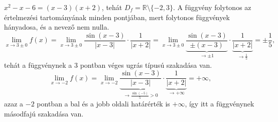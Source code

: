 \documentclass[11pt]{scrartcl}
\begin{document}
$x^2 - x - 6 = (x - 3)(x + 2)$, tehát
$D_f = \mathbb{R} \setminus \{-2, 3\}$. A függvény folytonos az
értelmezési tartományának minden pontjában, mert folytonos
függvények hányadosa, és a nevező nem nulla.
\[
	\lim_{x \to 3 \pm 0} f(x)
	= \lim_{x \to 3 \pm 0} \frac{\sin(x - 3)}{|x - 3|} \cdot \frac{1}{|x + 2|}
	=
	\lim_{x \to 3 \pm 0}
	\underbrace{\frac{\sin(x - 3)}{\pm (x - 3)}}_{\to \pm 1} \cdot
	\underbrace{\frac{1}{|x + 2|}}_{\to \frac{1}{5}}
	=
	\pm \frac{1}{5},
\]
tehát a függvénynek a $3$ pontban véges ugrás típusú szakadása van.
\[
	\lim_{x \to -2} f(x)
	= \lim_{x \to -2}
	\underbrace{\frac{\sin(x - 3)}{|x - 3|}}_{\to \frac{\sin(-5)}{5} > 0} \cdot
	\underbrace{\frac{1}{|x + 2|}}_{\to +\infty}
	= +\infty,
\]
azaz a $-2$ pontban a bal és a jobb oldali határérték is $+\infty$, így itt a
függvénynek másodfajú szakadása van.
\end{document}
